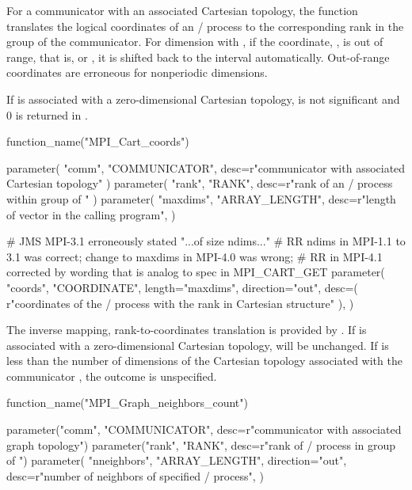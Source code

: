 For a communicator with an associated Cartesian topology, the function
 translates the logical coordinates of an \MPI/ process to
the corresponding rank in the group of the communicator.
For dimension  with , if the coordinate,
, is out of range, that is, \mbox{} or
\mbox{}, it is shifted back to the interval
\mbox{} automatically. Out-of-range
coordinates are erroneous for nonperiodic dimensions.
 
If  is associated with a zero-dimensional Cartesian topology,
 is not significant and 0 is returned in . 

\begin{mpi-binding}
    function_name("MPI_Cart_coords")
    
    parameter(
        "comm", "COMMUNICATOR", desc=r"communicator with associated Cartesian topology"
    )
    parameter(
        "rank", "RANK", desc=r"rank of an \MPI/ process within group of "
    )
    parameter(
        "maxdims",
        "ARRAY_LENGTH",
        desc=r"length of vector   in the calling program",
    )
    
    # JMS MPI-3.1 erroneously stated "...of size ndims..."
    # RR ndims in MPI-1.1 to 3.1 was correct; change to maxdims in MPI-4.0 was wrong;
    # RR in MPI-4.1 corrected by wording that is analog to spec in MPI_CART_GET
    parameter(
        "coords",
        "COORDINATE",
        length="maxdims",
        direction="out",
        desc=(
            r"coordinates of the \MPI/ process with the rank  in Cartesian structure"
        ),
    )
\end{mpi-binding}

The inverse mapping, rank-to-coordinates translation is provided by
.
If  is associated with a zero-dimensional Cartesian topology,
 will be unchanged. 
If  is less than the number of dimensions of the Cartesian topology associated with the communicator , the outcome is unspecified.

\begin{mpi-binding}
    function_name("MPI_Graph_neighbors_count")
    
    parameter("comm", "COMMUNICATOR", desc=r"communicator with associated graph topology")
    parameter("rank", "RANK", desc=r"rank of \MPI/ process in group of ")
    parameter(
        "nneighbors",
        "ARRAY_LENGTH",
        direction="out",
        desc=r"number of neighbors of specified \MPI/ process",
    )
\end{mpi-binding}

